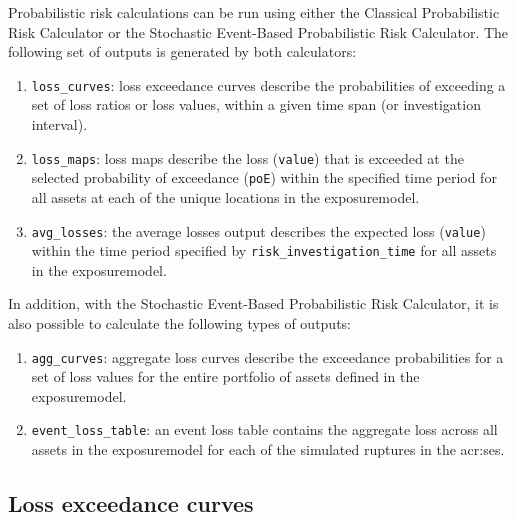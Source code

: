 Probabilistic risk calculations can be run using either the Classical
Probabilistic Risk Calculator or the Stochastic Event-Based Probabilistic Risk
Calculator. The following set of outputs is generated by both calculators:

\begin{enumerate}

  \item \Verb+loss_curves+: loss exceedance curves describe the probabilities
    of exceeding a set of loss ratios or loss values, within a given time span
    (or investigation interval).

  \item \Verb+loss_maps+: loss maps describe the loss (\Verb+value+) 
    that is exceeded at the selected probability of exceedance (\Verb+poE+)
    within the specified time period for all \glspl{asset} at each of the unique
    locations in the \gls{exposuremodel}.

  \item \Verb+avg_losses+: the average losses output describes the expected
    loss (\Verb+value+) within the time period specified by
    \Verb+risk_investigation_time+ for all \glspl{asset}
    in the \gls{exposuremodel}.

\end{enumerate}

In addition, with the Stochastic Event-Based Probabilistic Risk
Calculator, it is also possible to calculate the following types of outputs:

\begin{enumerate}

  \item \Verb+agg_curves+: aggregate loss curves describe the exceedance 
    probabilities for a set of loss values for the entire portfolio of 
    \glspl{asset} defined in the \gls{exposuremodel}.

  \item \Verb+event_loss_table+: an event loss table contains the aggregate 
    loss across all \glspl{asset} in the \gls{exposuremodel} for each of the
    simulated \glspl{rupture} in the \glsdesc{acr:ses}.

\end{enumerate}



\subsection{Loss exceedance curves}
\label{subsec:loss_curves}

